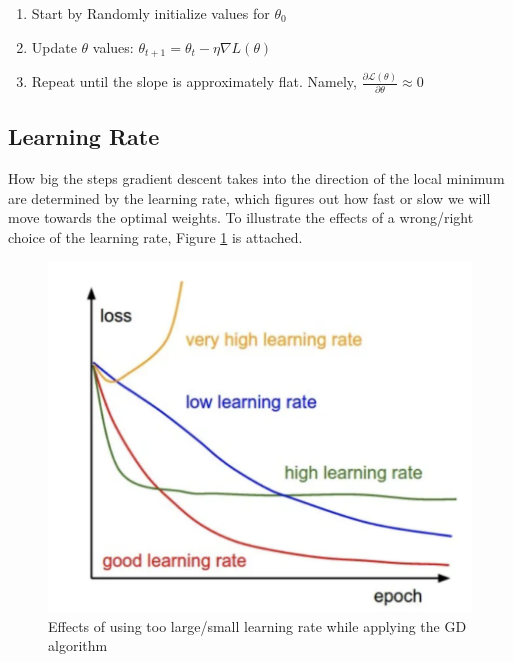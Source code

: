 \documentclass{article}
\begin{document}
\begin{enumerate}
	\item Start by Randomly initialize values for $\theta_{0}$
	\item Update $\theta$ values: $\theta_{t+1}=\theta_{t}-\eta\nabla L(\theta)$
	\item Repeat until the slope is approximately flat. Namely,
	      $\frac{\partial\mathcal{L}(\theta)}{\partial\theta}\approx 0$
\end{enumerate}

\subsection{Learning Rate}
How big the steps gradient descent takes into the direction of the local minimum are determined by the
learning rate, which figures out how fast or slow we will move towards the optimal weights. To illustrate
the effects of a wrong/right choice of the learning rate, Figure \ref{fig:lr} is attached.

\begin{figure}[h!]
    \centering
    \includegraphics[scale=0.75]{figure.png}
    \caption{Effects of using too large/small learning rate while applying the GD algorithm}
    \label{fig:lr}
  \end{figure}
\end{document}
